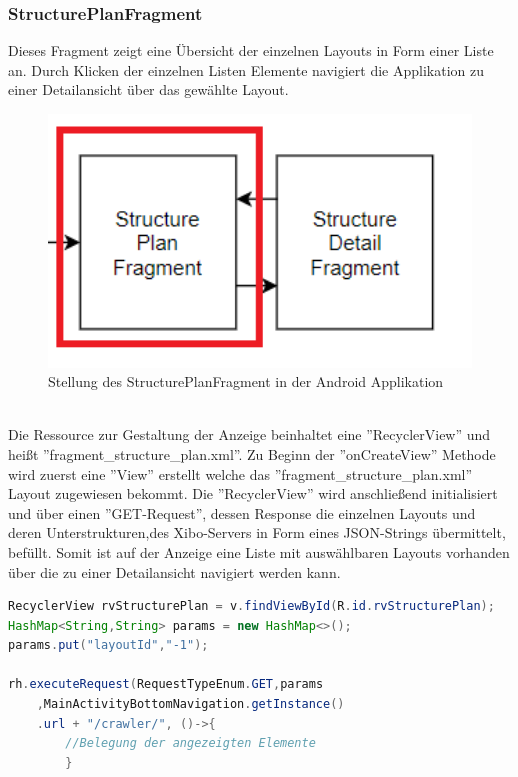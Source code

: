 \subsubsection{StructurePlanFragment}
Dieses Fragment zeigt eine Übersicht der einzelnen Layouts in Form einer Liste an. Durch Klicken der einzelnen Listen Elemente navigiert die Applikation zu einer Detailansicht über das gewählte Layout.
\\
\begin{figure}[H]
\centering
\includegraphics[width=1.0\textwidth]{images/06_AndroidApp/06_StructurePlanStellung}
\caption{Stellung des StructurePlanFragment in der Android Applikation}
\label{fig:mediaNav}
\end{figure}
\\	
Die Ressource zur Gestaltung der Anzeige beinhaltet eine ''RecyclerView'' und heißt ''fragment\_structure\_plan.xml''. Zu Beginn der ''onCreateView'' Methode wird zuerst eine ''View'' erstellt welche das ''fragment\_structure\_plan.xml'' Layout zugewiesen bekommt. Die ''RecyclerView'' wird anschließend initialisiert und über einen ''GET-Request'', dessen Response die einzelnen Layouts und deren Unterstrukturen,des Xibo-Servers in Form eines JSON-Strings übermittelt, befüllt. Somit ist auf der Anzeige eine Liste mit auswählbaren Layouts vorhanden über die zu einer Detailansicht navigiert werden kann. 
\begin{lstlisting}[language=Java,caption={Abfrage und anzeigen der Daten im StructurePlanFragment}]
RecyclerView rvStructurePlan = v.findViewById(R.id.rvStructurePlan);
HashMap<String,String> params = new HashMap<>();
params.put("layoutId","-1");
    
rh.executeRequest(RequestTypeEnum.GET,params
	,MainActivityBottomNavigation.getInstance()
	.url + "/crawler/", ()->{
		//Belegung der angezeigten Elemente
		}
\end{lstlisting}

